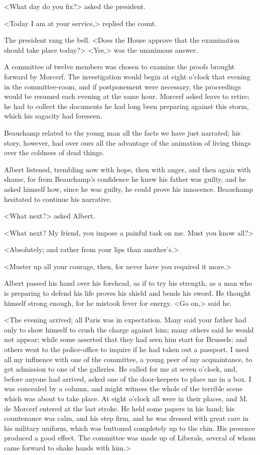  <What day do you fix?> asked the president. 

 <Today I am at your service,> replied the count. 

 The president rang the bell. <Does the House approve that the examination should take place today?>  <Yes,> was the unanimous answer. 

 A committee of twelve members was chosen to examine the proofs brought forward by Morcerf. The investigation would begin at eight o'clock that evening in the committee-room, and if postponement were necessary, the proceedings would be resumed each evening at the same hour. Morcerf asked leave to retire; he had to collect the documents he had long been preparing against this storm, which his sagacity had foreseen. 

 Beauchamp related to the young man all the facts we have just narrated; his story, however, had over ours all the advantage of the animation of living things over the coldness of dead things. 

 Albert listened, trembling now with hope, then with anger, and then again with shame, for from Beauchamp's confidence he knew his father was guilty, and he asked himself how, since he was guilty, he could prove his innocence. Beauchamp hesitated to continue his narrative. 

 <What next?> asked Albert. 

 <What next? My friend, you impose a painful task on me. Must you know all?> 

 <Absolutely; and rather from your lips than another's.> 

 <Muster up all your courage, then, for never have you required it more.> 

 Albert passed his hand over his forehead, as if to try his strength, as a man who is preparing to defend his life proves his shield and bends his sword. He thought himself strong enough, for he mistook fever for energy. <Go on,> said he. 

 <The evening arrived; all Paris was in expectation. Many said your father had only to show himself to crush the charge against him; many others said he would not appear; while some asserted that they had seen him start for Brussels; and others went to the police-office to inquire if he had taken out a passport. I used all my influence with one of the committee, a young peer of my acquaintance, to get admission to one of the galleries. He called for me at seven o'clock, and, before anyone had arrived, asked one of the door-keepers to place me in a box. I was concealed by a column, and might witness the whole of the terrible scene which was about to take place. At eight o'clock all were in their places, and M. de Morcerf entered at the last stroke. He held some papers in his hand; his countenance was calm, and his step firm, and he was dressed with great care in his military uniform, which was buttoned completely up to the chin. His presence produced a good effect. The committee was made up of Liberals, several of whom came forward to shake hands with him.> 

